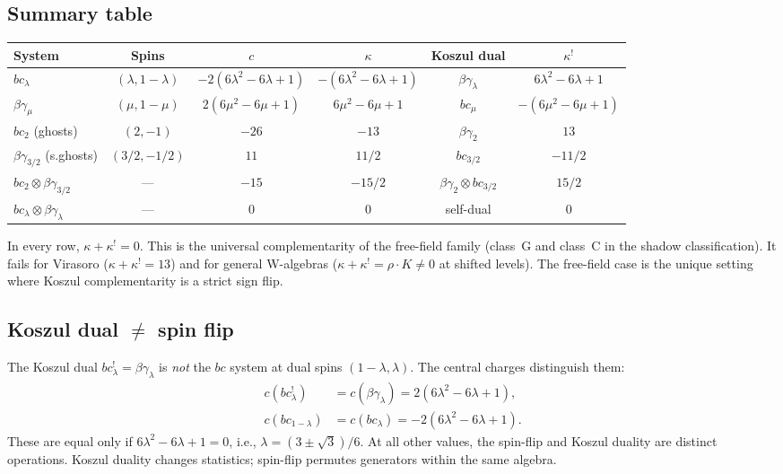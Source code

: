 \documentclass[11pt]{article}
\begin{document}
\subsection{Summary table}

\begin{center}
\renewcommand{\arraystretch}{1.3}
\begin{tabular}{lccccc}
\hline
\textbf{System} & \textbf{Spins} & $c$ & $\kappa$ &
  \textbf{Koszul dual} & $\kappa^!$ \\
\hline
$bc_\lambda$ & $(\lambda, 1{-}\lambda)$ &
  $-2(6\lambda^2{-}6\lambda{+}1)$ &
  $-(6\lambda^2{-}6\lambda{+}1)$ &
  $\beta\gamma_\lambda$ &
  $6\lambda^2{-}6\lambda{+}1$ \\
$\beta\gamma_\mu$ & $(\mu, 1{-}\mu)$ &
  $2(6\mu^2{-}6\mu{+}1)$ &
  $6\mu^2{-}6\mu{+}1$ &
  $bc_\mu$ &
  $-(6\mu^2{-}6\mu{+}1)$ \\
\hline
$bc_2$ (ghosts) & $(2, -1)$ & $-26$ & $-13$ &
  $\beta\gamma_2$ & $13$ \\
$\beta\gamma_{3/2}$ (s.ghosts) & $(3/2, -1/2)$ & $11$ &
  $11/2$ & $bc_{3/2}$ & $-11/2$ \\
$bc_2 \otimes \beta\gamma_{3/2}$ & --- & $-15$ &
  $-15/2$ & $\beta\gamma_2 \otimes bc_{3/2}$ & $15/2$ \\
\hline
$bc_\lambda \otimes \beta\gamma_\lambda$ & --- & $0$ &
  $0$ & self-dual & $0$ \\
\hline
\end{tabular}
\end{center}

\begin{remark}
In every row, $\kappa + \kappa^! = 0$.  This is the universal
complementarity of the free-field family (class~G and class~C
in the shadow classification).  It fails for Virasoro
($\kappa + \kappa^! = 13$) and for general W-algebras
($\kappa + \kappa^! = \rho \cdot K \neq 0$ at shifted
levels).  The free-field case is the unique setting where
Koszul complementarity is a strict sign flip.
\end{remark}

\subsection{Koszul dual $\neq$ spin flip}

\begin{proposition}
\label{prop:bc-not-spin-flip}
The Koszul dual $bc_\lambda^! = \beta\gamma_\lambda$ is
\emph{not} the $bc$ system at dual spins $(1-\lambda, \lambda)$.
The central charges distinguish them:
\begin{align*}
c(bc_\lambda^!) &= c(\beta\gamma_\lambda)
= 2(6\lambda^2 - 6\lambda + 1), \\
c(bc_{1-\lambda}) &= c(bc_\lambda) = -2(6\lambda^2 - 6\lambda + 1).
\end{align*}
These are equal only if $6\lambda^2 - 6\lambda + 1 = 0$, i.e.,
$\lambda = (3 \pm \sqrt{3})/6$.  At all other values, the spin-flip
and Koszul duality are distinct operations.  Koszul duality changes
statistics; spin-flip permutes generators within the same algebra.
\end{proposition}
\end{document}

